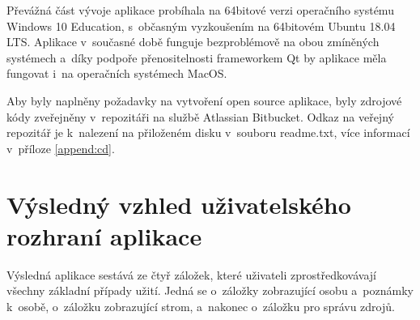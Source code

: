 Převážná část vývoje aplikace probíhala na 64bitové verzi operačního systému Windows 10 Education, s~občasným vyzkoušením na 64bitovém Ubuntu 18.04 LTS. Aplikace v~současné době funguje bezproblémově na obou zmíněných systémech a~díky podpoře přenositelnosti frameworkem Qt by aplikace měla fungovat i~na operačních systémech MacOS.\par
Aby byly naplněny požadavky na vytvoření open source aplikace, byly zdrojové kódy zveřejněny v~repozitáři na službě Atlassian Bitbucket. Odkaz na veřejný repozitář je k~nalezení na přiloženém disku v~souboru readme.txt, více informací v~příloze \ref{append:cd}. 

	\section{Výsledný vzhled uživatelského rozhraní aplikace}
	Výsledná aplikace sestává ze čtyř záložek, které uživateli zprostředkovávají všechny základní případy užití. Jedná se o~záložky zobrazující osobu a~poznámky k~osobě, o~záložku zobrazující strom, a~nakonec o~záložku pro správu zdrojů.\par
